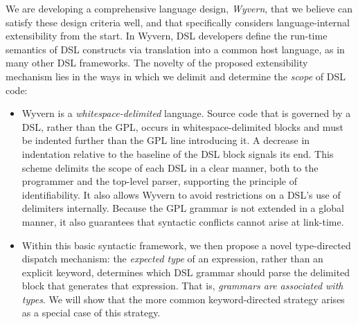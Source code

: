 We are developing a comprehensive language design, \emph{Wyvern}, that we believe can satisfy these design criteria well, and that specifically considers language-internal extensibility from the start. In Wyvern, DSL developers define the run-time semantics of DSL constructs via translation
into a common host language, as in many other DSL frameworks. The novelty of the proposed extensibility mechanism lies in the ways in which we delimit and determine the \emph{scope} of DSL code:
\begin{itemize}
% 
\item Wyvern is a \emph{whitespace-delimited} language. Source code that is governed by a DSL, rather than the GPL, occurs in whitespace-delimited blocks and must be indented further than the GPL line introducing it. A decrease in indentation relative to the baseline of the DSL block signals its end. This scheme delimits the scope of each DSL in a clear manner, both to 
  the programmer and the top-level parser, supporting the principle of identifiability.  It also allows Wyvern to avoid restrictions on a DSL's use of delimiters internally. Because the GPL grammar is not extended in a global manner, it also guarantees that syntactic 
  conflicts cannot arise at link-time.


  

\item Within this basic syntactic framework, we then propose a novel
type-directed dispatch mechanism: the \emph{expected type} of an expression, rather than an explicit keyword, 
determines which DSL grammar should parse the delimited block that generates that expression. That is, \emph{grammars are associated with types}. We will show that the  more common keyword-directed strategy arises as a special case of this strategy. 
\end{itemize}

